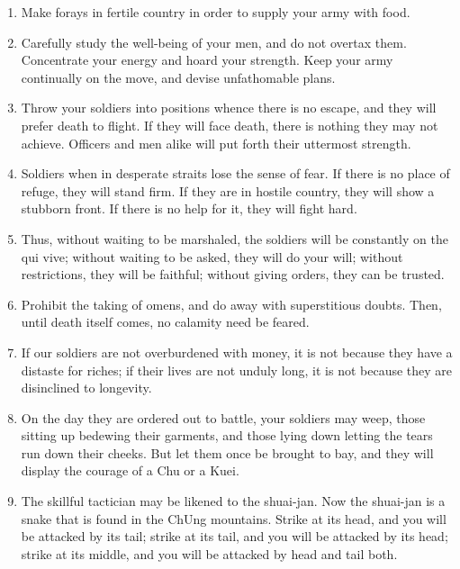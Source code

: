 \begin{enumerate}
  \item Make forays in fertile country in order to supply your army
    with food.

  \item Carefully study the well-being of your men, and do not overtax
    them. Concentrate your energy and hoard your strength. Keep your
    army continually on the move, and devise unfathomable plans.

  \item Throw your soldiers into positions whence there is no escape,
    and they will prefer death to flight. If they will face death,
    there is nothing they may not achieve. Officers and men alike will
    put forth their uttermost strength.

  \item Soldiers when in desperate straits lose the sense of fear. If
    there is no place of refuge, they will stand firm. If they are in
    hostile country, they will show a stubborn front. If there is no
    help for it, they will fight hard.

  \item Thus, without waiting to be marshaled, the soldiers will be
    constantly on the qui vive; without waiting to be asked, they will
    do your will; without restrictions, they will be faithful; without
    giving orders, they can be trusted.

  \item Prohibit the taking of omens, and do away with superstitious
    doubts. Then, until death itself comes, no calamity need be
    feared.

  \item If our soldiers are not overburdened with money, it is not
    because they have a distaste for riches; if their lives are not
    unduly long, it is not because they are disinclined to longevity.

  \item On the day they are ordered out to battle, your soldiers may
    weep, those sitting up bedewing their garments, and those lying
    down letting the tears run down their cheeks. But let them once be
    brought to bay, and they will display the courage of a Chu or a
    Kuei.

  \item The skillful tactician may be likened to the shuai-jan. Now
    the shuai-jan is a snake that is found in the ChUng mountains.
    Strike at its head, and you will be attacked by its tail; strike
    at its tail, and you will be attacked by its head; strike at its
    middle, and you will be attacked by head and tail both.


\end{enumerate}
